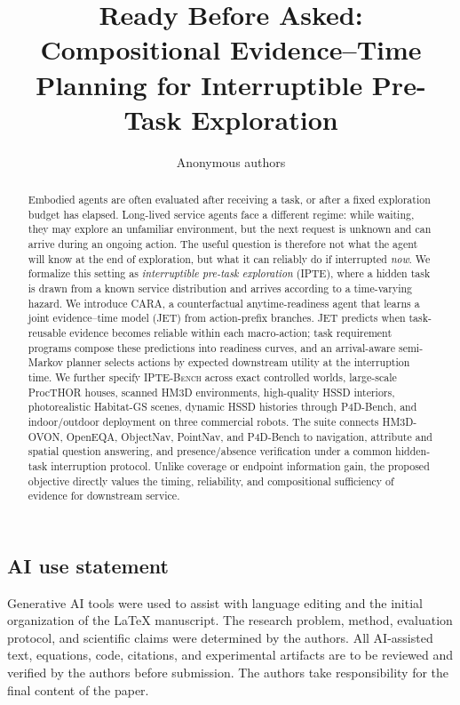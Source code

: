 \documentclass{article}
\title{Ready Before Asked: Compositional Evidence--Time Planning for Interruptible Pre-Task Exploration}
\author{Anonymous authors}
\newcommand{\method}{\textsc{CARA}}
\newcommand{\jet}{\textsc{JET}}
\newcommand{\taskname}{\textsc{IPTE}}
\newcommand{\bench}{\textsc{IPTE-Bench}}
\begin{document}
\maketitle

\begin{abstract}
Embodied agents are often evaluated after receiving a task, or after a fixed exploration budget has elapsed.
Long-lived service agents face a different regime: while waiting, they may explore an unfamiliar environment, but the next request is unknown and can arrive during an ongoing action.
The useful question is therefore not what the agent will know at the end of exploration, but what it can reliably do if interrupted \emph{now}.
We formalize this setting as \emph{interruptible pre-task exploration} (\taskname), where a hidden task is drawn from a known service distribution and arrives according to a time-varying hazard.
We introduce \method{}, a counterfactual anytime-readiness agent that learns a joint evidence--time model (\jet{}) from action-prefix branches.
\jet{} predicts when task-reusable evidence becomes reliable within each macro-action; task requirement programs compose these predictions into readiness curves, and an arrival-aware semi-Markov planner selects actions by expected downstream utility at the interruption time.
We further specify \bench{} across exact controlled worlds, large-scale ProcTHOR houses, scanned HM3D environments, high-quality HSSD interiors, photorealistic Habitat-GS scenes, dynamic HSSD histories through P4D-Bench, and indoor/outdoor deployment on three commercial robots. The suite connects HM3D-OVON, OpenEQA, ObjectNav, PointNav, and P4D-Bench to navigation, attribute and spatial question answering, and presence/absence verification under a common hidden-task interruption protocol.
Unlike coverage or endpoint information gain, the proposed objective directly values the timing, reliability, and compositional sufficiency of evidence for downstream service.
\end{abstract}











\subsection*{AI use statement}
Generative AI tools were used to assist with language editing and the initial organization of the \LaTeX{} manuscript.
The research problem, method, evaluation protocol, and scientific claims were determined by the authors.
All AI-assisted text, equations, code, citations, and experimental artifacts are to be reviewed and verified by the authors before submission.
The authors take responsibility for the final content of the paper.
\end{document}
